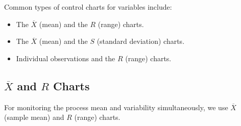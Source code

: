 \documentclass[twoside]{book}
\begin{document}
Common types of control charts for variables include:
\begin{itemize}
\item The $ \overline{X}$ (mean) and the $ R $ (range) charts.
\item The $ \overline{X}$ (mean) and the $ S $ (standard deviation) charts.
\item Individual observations and the $ R $ (range) charts.
\end{itemize}

\subsection{$\overline{X}$ and $ R $ Charts}

For monitoring the process mean and variability simultaneously, we use $\overline{X}$ (sample mean) and $ R $ (range) charts.
\end{document}
